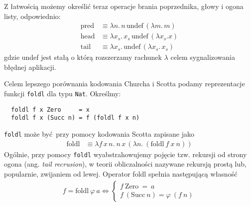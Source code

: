 Z łatwością możemy określić teraz operacje brania poprzednika, głowy i ogona listy, odpowiednio:
\begin{align*}
  \mathrm{pred}&\equiv \lambda n .\, n\, \mathrm{undef}\, (\lambda m.\,m)\\
  \mathrm{head}&\equiv \lambda x_s .\, x_s\, \mathrm{undef}\, (\lambda x_s . x)\\
  \mathrm{tail}&\equiv \lambda x_s.\, \mathrm{undef}\, (\lambda x_s.\,x_s)
\end{align*}
gdzie undef jest stałą o którą rozszerzamy rachunek \(\lambda\) celem sygnalizowania błędnej aplikacji.

  Celem lepszego porównania kodowania Churcha i Scotta podamy reprezentacje funkcji \texttt{foldl} dla typu \texttt{Nat}. Określmy:
\begin{verbatim}
  foldl f x Zero     = x
  foldl f x (Succ n) = f (foldl f x n)
\end{verbatim}
\texttt{foldl} może być przy pomocy kodowania Scotta zapisane jako
\begin{align*}
  \mathrm{foldl}  &\equiv \lambda f\,x\,n.\ n\,x\,(\lambda n.\ (\mathrm{foldl}\ f\ x\ n))
\end{align*}
Ogólnie, przy pomocy \texttt{foldl} wyabstrahowujemy pojęcie tzw. rekursji od strony ogona (ang. \emph{tail recrusion}), w teorii obliczalności nazywane rekursją prostą lub, popularnie, zwijaniem od lewej. Operator foldl spełnia następującą własność \cite{Hutton:1999:TUE:968578.968579}
  \begin{align}\label{def:foldl} 
     f = \mathrm{foldl}\ \varphi\  a \iff \begin{cases}
       f\ \mathrm{Zero}\ =\ a\\
       f\ (\mathrm{Succ}\ n) = \varphi\ (f\ n)
     \end{cases}
  \end{align}


